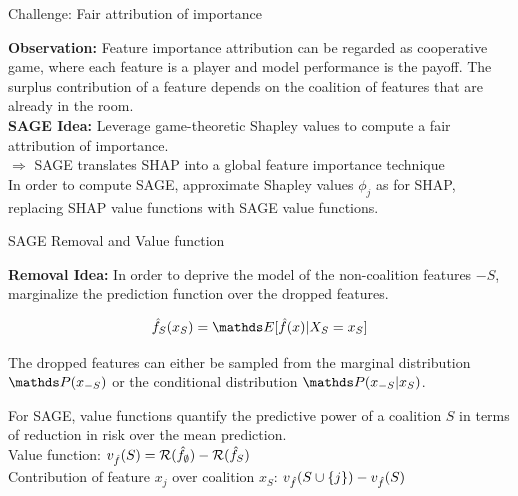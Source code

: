 \documentclass[11pt,compress,t,notes=noshow, aspectratio=169, xcolor=table]{beamer}
\begin{document}
\begin{frame}{Challenge: Fair attribution of importance }

\textbf{Observation:} Feature importance attribution can be regarded as cooperative game, where each feature is a player and model performance is the payoff. The surplus contribution of a feature depends on the coalition of features that are already in the room.\\
\lz
\textbf{SAGE Idea:} Leverage game-theoretic Shapley values to compute a fair attribution of importance.\\
\lz
$\Rightarrow$ SAGE translates SHAP into a global feature importance technique\\
\lz
In order to compute SAGE, approximate Shapley values $\phi_j$ as for SHAP, replacing SHAP value functions with SAGE value functions.\\

  
\end{frame}


\begin{frame}{SAGE Removal and Value function}
  
 \textbf{Removal Idea:} In order to deprive the model of the non-coalition features $-S$, marginalize the prediction function over the dropped features.

$$\fh_S(x_S) = \E[\fh(x) | X_S = x_S]$$
  
The dropped features can either be sampled from the marginal distribution $\P(x_{-S})$ or the conditional distribution $\P(x_{-S}|x_S)$.\\
\lz


For SAGE, value functions quantify the predictive power of a coalition $S$ in terms of reduction in risk over the mean prediction.\\
\lz
Value function:  $ v_{\fh}(S) = \risk(\fh_{\emptyset}) - \risk(\fh_{S})$\\
\lz
Contribution of feature $x_j$ over coalition $x_S$:  $v_{\fh}(S \cup \{j\}) - v_{\fh}(S)$\\
\lz

\end{frame}
\end{document}
